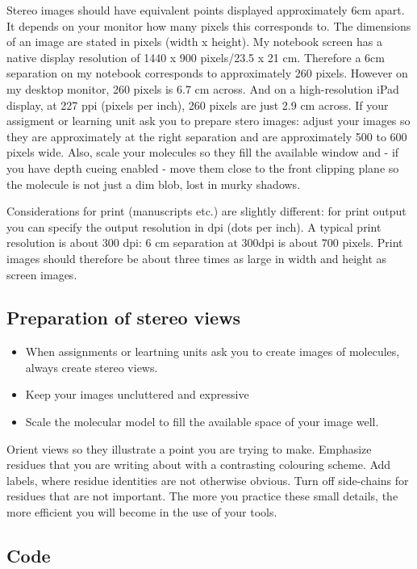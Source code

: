 \documentclass[]{book}
\providecommand{\tightlist}{%
  \setlength{\itemsep}{0pt}\setlength{\parskip}{0pt}}
\begin{document}
Stereo images should have equivalent points displayed approximately 6cm
apart. It depends on your monitor how many pixels this corresponds to.
The dimensions of an image are stated in pixels (width x height). My
notebook screen has a native display resolution of 1440 x 900
pixels/23.5 x 21 cm. Therefore a 6cm separation on my notebook
corresponds to approximately 260 pixels. However on my desktop monitor,
260 pixels is 6.7 cm across. And on a high-resolution iPad display, at
227 ppi (pixels per inch), 260 pixels are just 2.9 cm across. If your
assigment or learning unit ask you to prepare stero images: adjust your
images so they are approximately at the right separation and are
approximately 500 to 600 pixels wide. Also, scale your molecules so they
fill the available window and - if you have depth cueing enabled - move
them close to the front clipping plane so the molecule is not just a dim
blob, lost in murky shadows.

Considerations for print (manuscripts etc.) are slightly different: for
print output you can specify the output resolution in dpi (dots per
inch). A typical print resolution is about 300 dpi: 6 cm separation at
300dpi is about 700 pixels. Print images should therefore be about three
times as large in width and height as screen images.

\subsection{Preparation of stereo
views}\label{preparation-of-stereo-views}

\begin{itemize}
\tightlist
\item
  When assignments or leartning units ask you to create images of
  molecules, always create stereo views.
\item
  Keep your images uncluttered and expressive
\item
  Scale the molecular model to fill the available space of your image
  well.
\end{itemize}

Orient views so they illustrate a point you are trying to make.
Emphasize residues that you are writing about with a contrasting
colouring scheme. Add labels, where residue identities are not otherwise
obvious. Turn off side-chains for residues that are not important. The
more you practice these small details, the more efficient you will
become in the use of your tools.

\subsection{Code}\label{code}
\end{document}
